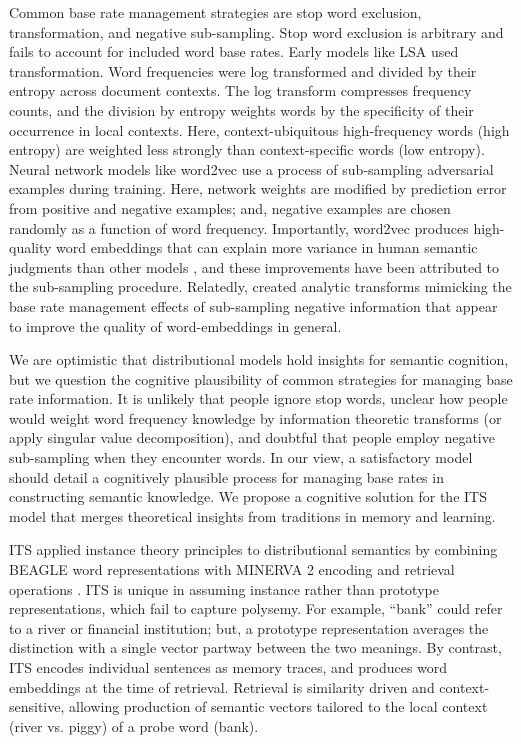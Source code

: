 \documentclass[10pt,letterpaper]{article}
\begin{document}
Common base rate management strategies are stop word exclusion, transformation, and negative sub-sampling. Stop word exclusion is arbitrary and fails to account for included word base rates. Early models like LSA \cite{landauerSolutionPlatoProblem1997} used transformation. Word frequencies were log transformed and divided by their entropy across document contexts. The log transform compresses frequency counts, and the division by entropy weights words by the specificity of their occurrence in local contexts. Here, context-ubiquitous high-frequency words (high entropy) are weighted less strongly than context-specific words (low entropy). Neural network models like word2vec \cite{mikolovDistributedRepresentationsWords2013} use a process of sub-sampling adversarial examples during training. Here, network weights are modified by prediction error from positive and negative examples; and, negative examples are chosen randomly as a function of word frequency. Importantly, word2vec produces high-quality word embeddings that can explain more variance in human semantic judgments than other models \cite{manderaExplainingHumanPerformance2017a}, and these improvements have been attributed to the sub-sampling procedure. Relatedly, \citeauthor{johnsRoleNegativeInformation2019} \citeyear{johnsRoleNegativeInformation2019} created analytic transforms mimicking the base rate management effects of sub-sampling negative information that appear to improve the quality of word-embeddings in general.

We are optimistic that distributional models hold insights for semantic cognition, but we question the cognitive plausibility of common strategies for managing base rate information. It is unlikely that people ignore stop words, unclear how people would weight word frequency knowledge by information theoretic transforms (or apply singular value decomposition), and doubtful that people employ negative sub-sampling when they encounter words. In our view, a satisfactory model should detail a cognitively plausible process for managing base rates in constructing semantic knowledge. We propose a cognitive solution for the ITS model that merges theoretical insights from traditions in memory and learning.

ITS applied instance theory principles \cite{jacobyNonanalyticCognitionMemory1984} to distributional semantics by combining BEAGLE word representations \cite{jonesRepresentingWordMeaning2007} with MINERVA 2 encoding and retrieval operations \cite{hintzmanMINERVASimulationModel1984}. ITS is unique in assuming instance rather than prototype representations, which fail to capture polysemy. For example, ``bank'' could refer to a river or financial institution; but, a prototype representation averages the distinction with a single vector partway between the two meanings. By contrast, ITS encodes individual sentences as memory traces, and produces word embeddings at the time of retrieval. Retrieval is similarity driven and context-sensitive, allowing production of semantic vectors tailored to the local context (river vs. piggy) of a probe word (bank).
\end{document}
